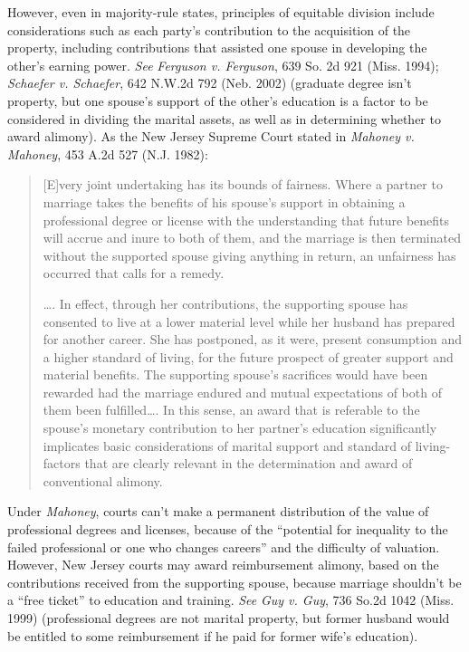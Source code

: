 However, even in majority-rule states, principles of equitable division include
considerations such as each party's contribution to the acquisition of the
property, including contributions that assisted one spouse in developing the
other's earning power. \textit{See} \emph{Ferguson v. Ferguson}, 639 So. 2d 921
(Miss. 1994); \emph{Schaefer v. Schaefer}, 642 N.W.2d 792 (Neb. 2002) (graduate
degree isn't property, but one spouse's support of the other's education is a
factor to be considered in dividing the marital assets, as well as in
determining whether to award alimony). As the New Jersey Supreme Court stated in
\emph{Mahoney v. Mahoney}, 453 A.2d 527 (N.J. 1982):
\begin{quotation}
[E]very joint undertaking has its bounds of fairness. Where a partner to
marriage takes the benefits of his spouse's support in obtaining a professional
degree or license with the understanding that future benefits will accrue and
inure to both of them, and the marriage is then terminated without the
supported spouse giving anything in return, an unfairness has occurred that
calls for a remedy.

\dots. In effect, through her contributions, the supporting spouse has
consented to live at a lower material level while her husband has prepared for
another career. She has postponed, as it were, present consumption and a higher
standard of living, for the future prospect of greater support and material
benefits. The supporting spouse's sacrifices would have been rewarded had the
marriage endured and mutual expectations of both of them been fulfilled\dots.
In this sense, an award that is referable to the spouse's monetary contribution
to her partner's education significantly implicates basic considerations of
marital support and standard of living-factors that are clearly relevant in the
determination and award of conventional alimony.
\end{quotation}
Under \textit{Mahoney}, courts can't make a permanent distribution of the value
of professional degrees and licenses, because of the ``potential for inequality
to the failed professional or one who changes careers'' and the difficulty of
valuation. However, New Jersey courts may award reimbursement alimony, based
on the contributions received from the supporting spouse, because marriage
shouldn't be a ``free ticket'' to education and training. \textit{See} \emph{Guy
v. Guy}, 736 So.2d 1042 (Miss. 1999) (professional degrees are not marital
property, but former husband would be entitled to some reimbursement if he paid
for former wife's education).

